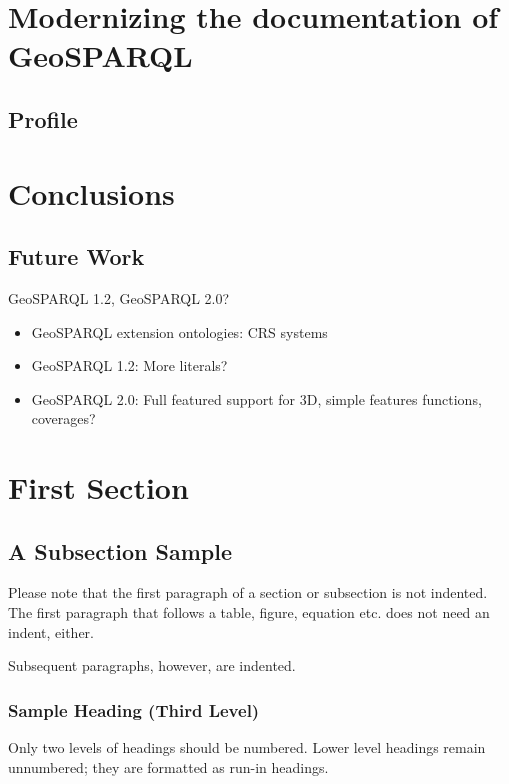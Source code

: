 \documentclass[runningheads]{llncs}
\begin{document}
\section{Modernizing the documentation of GeoSPARQL}
\label{sec:documentation}
\subsection{Profile}
\label{sec:profile}
\section{Conclusions}
\label{sec:conclusions}
\subsection{Future Work}
\label{sec:futurework}
GeoSPARQL 1.2, GeoSPARQL 2.0?
\begin{itemize}
    \item GeoSPARQL extension ontologies: CRS systems
    \item GeoSPARQL 1.2: More literals?
    \item GeoSPARQL 2.0: Full featured support for 3D, simple features functions, coverages?
\end{itemize}

\section{First Section}
\subsection{A Subsection Sample}
Please note that the first paragraph of a section or subsection is
not indented. The first paragraph that follows a table, figure,
equation etc. does not need an indent, either.

Subsequent paragraphs, however, are indented.

\subsubsection{Sample Heading (Third Level)} Only two levels of
headings should be numbered. Lower level headings remain unnumbered;
they are formatted as run-in headings.
\end{document}
